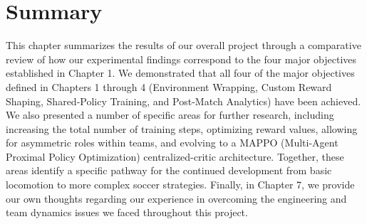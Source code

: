 \section{Summary}
\label{sec:con_summary}

This chapter summarizes the results of our overall project through a comparative review of how our experimental findings correspond to the four major objectives established in Chapter 1. We demonstrated that all four of the major objectives defined in Chapters 1 through 4 (Environment Wrapping, Custom Reward Shaping, Shared-Policy Training, and Post-Match Analytics) have been achieved.
We also presented a number of specific areas for further research, including increasing the total number of training steps, optimizing reward values, allowing for asymmetric roles within teams, and evolving to a MAPPO (Multi-Agent Proximal Policy Optimization) centralized-critic architecture. Together, these areas identify a specific pathway for the continued development from basic locomotion to more complex soccer strategies. Finally, in Chapter 7, we provide our own thoughts regarding our experience in overcoming the engineering and team dynamics issues we faced throughout this project.